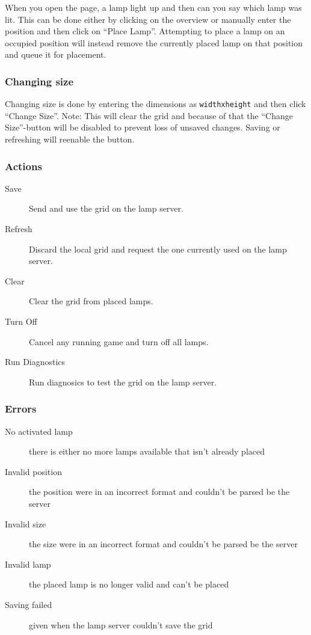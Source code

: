 When you open the page, a lamp light up and then can you say which lamp was
lit. This can be done either by clicking on the overview or manually enter the
position and then click on ``Place Lamp''. Attempting to place a lamp on an
occupied position will instead remove the currently placed lamp on that
position and queue it for placement.

\subsubsection{Changing size}
Changing size is done by entering the dimensions as \texttt{widthxheight} and then
click ``Change Size''.  Note: This will clear the grid and because of that the
``Change Size''-button will be disabled to prevent loss of unsaved changes.
Saving or refreshing will reenable the button.

\subsubsection{Actions}
  \begin{description}
    \item[Save]             Send and use the grid on the lamp server.
    \item[Refresh]          Discard the local grid and request the one currently used on the lamp server.
    \item[Clear]            Clear the grid from placed lamps.
    \item[Turn Off]         Cancel any running game and turn off all lamps.
    \item[Run Diagnostics]  Run diagnosics to test the grid on the lamp server.
  \end{description}

\subsubsection{Errors}
  \begin{description}
    \item[No activated lamp]  there is either no more lamps available that isn't already placed
    \item[Invalid position]   the position were in an incorrect format and couldn't be parsed be the server
    \item[Invalid size]       the size were in an incorrect format and couldn't be parsed be the server
    \item[Invalid lamp]       the placed lamp is no longer valid and can't be placed
    \item[Saving failed]      given when the lamp server couldn't save the grid
  \end{description}
